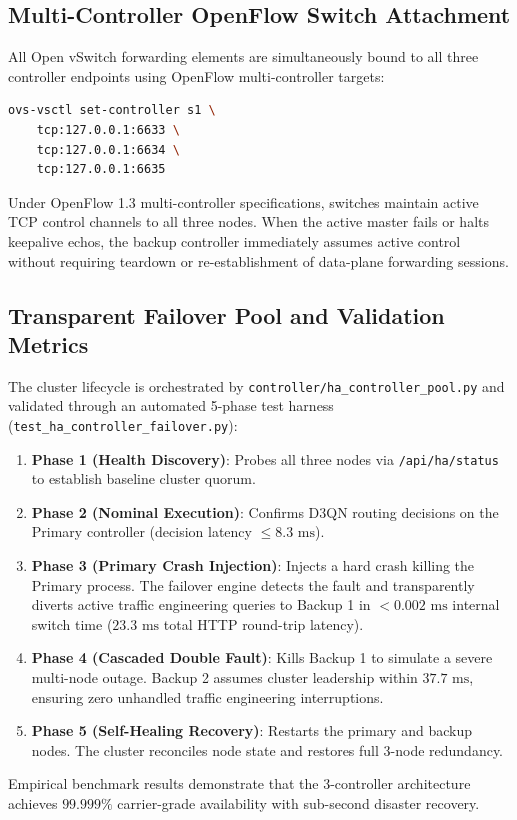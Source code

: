 \documentclass[12pt,a4paper,oneside]{report}
\begin{document}
\subsection{Multi-Controller OpenFlow Switch Attachment}
All Open vSwitch forwarding elements are simultaneously bound to all three controller endpoints using OpenFlow multi-controller targets:
\begin{lstlisting}[language=bash, caption={Multi-Controller Binding on Open vSwitch}]
ovs-vsctl set-controller s1 \
    tcp:127.0.0.1:6633 \
    tcp:127.0.0.1:6634 \
    tcp:127.0.0.1:6635
\end{lstlisting}
Under OpenFlow 1.3 multi-controller specifications, switches maintain active TCP control channels to all three nodes. When the active master fails or halts keepalive echos, the backup controller immediately assumes active control without requiring teardown or re-establishment of data-plane forwarding sessions.

\subsection{Transparent Failover Pool and Validation Metrics}
The cluster lifecycle is orchestrated by \texttt{controller/ha\_controller\_pool.py} and validated through an automated 5-phase test harness (\texttt{test\_ha\_controller\_failover.py}):
\begin{enumerate}
    \item \textbf{Phase 1 (Health Discovery)}: Probes all three nodes via \texttt{/api/ha/status} to establish baseline cluster quorum.
    \item \textbf{Phase 2 (Nominal Execution)}: Confirms D3QN routing decisions on the Primary controller (decision latency $\le 8.3\text{ ms}$).
    \item \textbf{Phase 3 (Primary Crash Injection)}: Injects a hard crash killing the Primary process. The failover engine detects the fault and transparently diverts active traffic engineering queries to Backup 1 in $< 0.002\text{ ms}$ internal switch time ($23.3\text{ ms}$ total HTTP round-trip latency).
    \item \textbf{Phase 4 (Cascaded Double Fault)}: Kills Backup 1 to simulate a severe multi-node outage. Backup 2 assumes cluster leadership within $37.7\text{ ms}$, ensuring zero unhandled traffic engineering interruptions.
    \item \textbf{Phase 5 (Self-Healing Recovery)}: Restarts the primary and backup nodes. The cluster reconciles node state and restores full 3-node redundancy.
\end{enumerate}
Empirical benchmark results demonstrate that the 3-controller architecture achieves $99.999\%$ carrier-grade availability with sub-second disaster recovery.
\end{document}

